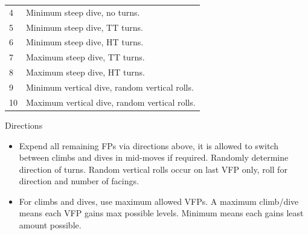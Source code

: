 \begin{onecolumntablefloat}[p]
\begin{onecolumntable}
\begin{tabularx}{\linewidth}{lX}
4   &Minimum steep dive, no turns.\\
5   &Minimum steep dive, TT turns.\\
6   &Minimum steep dive, HT turns.\\
7   &Maximum steep dive, TT turns.\\
8   &Maximum steep dive, HT turns.\\
9   &Minimum vertical dive, random vertical rolls.\\
10  &Maximum vertical dive, random vertical rolls.\\
\bottomrule
\end{tabularx}
\begin{tablenote}{\linewidth}
{\centering Directions\par\smallskip}

\begin{itemize}
    \item Expend all remaining FPs via directions above, it is allowed to switch between climbs and dives in mid-moves if required. Randomly determine direction of turns. Random vertical rolls occur on last VFP only, roll for direction and number of facings.
    \item For climbs and dives, use maximum allowed VFPs. A maximum climb/dive means each VFP gains max possible levels. Minimum means each gains least amount possible.
\end{itemize}
\end{tablenote}

\end{onecolumntable}
\end{onecolumntablefloat}
